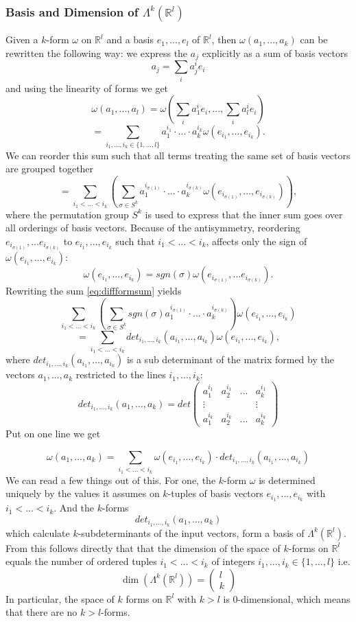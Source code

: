 \subsubsection{Basis and Dimension of $\Lambda^k(\mathbb R^l)$}
Given a $k$-form $\omega$ on $\mathbb R^l$ and a basis $e_1,...,e_l$ of $\mathbb R^l$, then $\omega(a_1,...,a_k)$ can be rewritten the following way: we express the $a_j$ explicitly as a sum of basis vectors
\[a_j = \sum_{i}a_j^ie_i\]
and using the linearity of forms we get
\[\omega(a_1,...,a_l) = \omega(\sum_{i}a_1^ie_i,...,\sum_{i}a_l^ie_i)\]
\[= \sum_{i_1,...,i_k \in\{1,...,l\}}a_1^{i_1}\cdot ... \cdot a_k^{i_k} \omega(e_{i_1},...,e_{i_k}).\]
We can reorder this sum such that all terms treating the same set of basis vectors are grouped together
\begin{equation}=\sum_{i_1<...<i_k}\left(\sum_{\sigma \in S^k} a_1^{i_{\sigma(1)}}\cdot ... \cdot a_k^{i_{\sigma(k)}} \omega(e_{i_{\sigma(1)}},...,e_{i_{\sigma(k)}})\right),\label{eq:diffformsum}\end{equation}
where the permutation group $S^k$ is used to express that the inner sum goes over all orderings of basis vectors. Because of the antisymmetry, reordering $e_{i_{\sigma(1)}},...e_{i_{\sigma(k)}}$ to $e_{i_1},...,e_{i_k}$ such that $i_1<...<i_k$, affects only the sign of $\omega(e_{i_1},...,e_{i_k})$:
\[\omega(e_{i_1},...,e_{i_k}) = sgn(\sigma)\omega(e_{i_{\sigma(1)}},...e_{i_{\sigma(k)}}).\]
Rewriting the sum \ref{eq:diffformsum} yields
\[\sum_{i_1<...<i_k}\left(\sum_{\sigma \in S^k} sgn(\sigma) a_1^{i_{\sigma(1)}}\cdot ... \cdot a_k^{i_{\sigma(k)}}\right) \omega(e_{i_1},...,e_{i_k})\]
\[ = \sum_{i_1<...<i_k} det_{i_1,...,i_k}(a_{i_1},...,a_{i_{k}}) \omega(e_{i_1},...,e_{i_k}),\]
where $det_{i_1,...,i_k}(a_{i_1},...,a_{i_{k}})$ is a sub determinant of the matrix formed by the vectors $a_1,...,a_k$ restricted to the lines $i_1,...,i_k$:
\[det_{i_1,...,i_k}(a_1,...,a_k) = det \begin{pmatrix}
a_1^{i_1} &a_2^{i_1} &...&a_k^{i_1} \\
\vdots & & & \vdots \\
a_1^{i_k} &a_2^{i_k} &...&a_k^{i_k} 
\end{pmatrix}\]
Put on one line we get

\[\omega(a_1,...,a_k)= \sum_{i_1<...<i_k} \omega(e_{i_1},...,e_{i_k}) \cdot det_{i_1,...,i_k}(a_{i_1},...,a_{i_{k}})\]
We can read a few things out of this. For one, the $k$-form $\omega$ is determined uniquely by the values it assumes on $k$-tuples of basis vectors $e_{i_1},...,e_{i_k}$ with $i_1 <...< i_k$. And the $k$-forms
\[det_{i_1,...,i_k}(a_{1},...,a_{k})\]
which calculate $k$-subdeterminants of the input vectors, form a basis of $\Lambda^k(\mathbb R^l)$. From this follows directly that that the dimension of the  space of $k$-forms on $\mathbb R^l$ equals the number of ordered tuples $i_1<...<i_k$ of integers $i_1,...,i_k \in \{1,...,l\} $ i.e.
\[\dim (\Lambda^k(\mathbb R^l)) = \begin{pmatrix}
l \\
k
\end{pmatrix}\] 
In particular, the space of $k$ forms on $\mathbb R^l$ with $k>l$ is 0-dimensional, which means that there are no $k>l$-forms.

